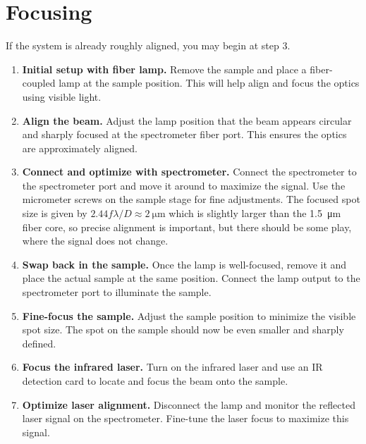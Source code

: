 \section*{Focusing}

If the system is already roughly aligned, you may begin at step 3.

\begin{enumerate}
  \item \textbf{Initial setup with fiber lamp.}  
  Remove the sample and place a fiber-coupled lamp at the sample position. This will help align and focus the optics using visible light.

  \item \textbf{Align the beam.}  
  Adjust the lamp position that the beam appears circular and sharply focused at the spectrometer fiber port. This ensures the optics are approximately aligned.

  \item \textbf{Connect and optimize with spectrometer.}  
  Connect the spectrometer to the spectrometer port and move it around to maximize the signal. Use the micrometer screws on the sample stage for fine adjustments.  
  The focused spot size is given by
  \(
   2.44 f \lambda /D \approx \SI{2}{\micro\meter}
  \)
  which is slightly larger than the \SI{1.5}{\micro\meter} fiber core, so precise alignment is important, but there should be some play, where the signal does not change.

  \item \textbf{Swap back in the sample.}  
  Once the lamp is well-focused, remove it and place the actual sample at the same position. Connect the lamp output to the spectrometer port to illuminate the sample.

  \item \textbf{Fine-focus the sample.}  
  Adjust the sample position to minimize the visible spot size. The spot on the sample should now be even smaller and sharply defined.

  \item \textbf{Focus the infrared laser.}  
  Turn on the infrared laser and use an IR detection card to locate and focus the beam onto the sample.

  \item \textbf{Optimize laser alignment.}  
  Disconnect the lamp and monitor the reflected laser signal on the spectrometer. Fine-tune the laser focus to maximize this signal.
\end{enumerate}

